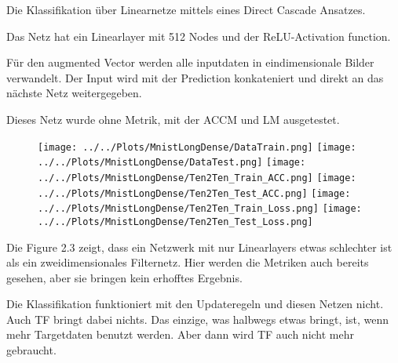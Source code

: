 Die Klassifikation über Linearnetze mittels eines Direct Cascade Ansatzes. 

Das Netz hat ein Linearlayer mit 512 Nodes und der ReLU-Activation function.

Für den augmented Vector werden alle inputdaten in eindimensionale Bilder verwandelt. Der Input wird mit der Prediction konkateniert und 
direkt an das nächste Netz weitergegeben.

Dieses Netz wurde ohne Metrik, mit der ACCM und LM ausgetestet. 

\begin{figure}[htpb]
    \texttt{[image: ../../Plots/MnistLongDense/DataTrain.png]}
    \texttt{[image: ../../Plots/MnistLongDense/DataTest.png]}
    \texttt{[image: ../../Plots/MnistLongDense/Ten2Ten\_Train\_ACC.png]}
    \texttt{[image: ../../Plots/MnistLongDense/Ten2Ten\_Test\_ACC.png]}
    \texttt{[image: ../../Plots/MnistLongDense/Ten2Ten\_Train\_Loss.png]}
    \texttt{[image: ../../Plots/MnistLongDense/Ten2Ten\_Test\_Loss.png]}
    \caption{\label{fig:linclass}}
\end{figure}

Die Figure 2.3 zeigt, dass ein Netzwerk mit nur Linearlayers etwas schlechter ist als ein zweidimensionales Filternetz. 
Hier werden die Metriken auch bereits gesehen, aber sie bringen kein erhofftes Ergebnis. 

Die Klassifikation funktioniert mit den Updateregeln und diesen Netzen nicht. Auch TF bringt dabei nichts. Das einzige, 
was halbwegs etwas bringt, ist, wenn mehr Targetdaten benutzt werden. Aber dann wird TF auch nicht mehr gebraucht. 

